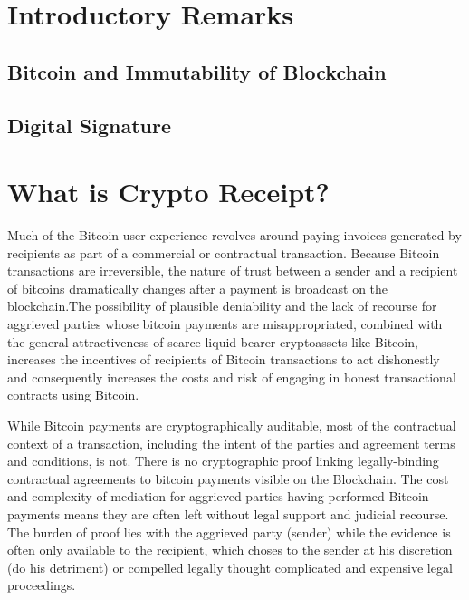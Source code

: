 


\section{Introductory Remarks}

\subsection{Bitcoin and Immutability of Blockchain}

\subsection{Digital Signature}
  


\section{What is Crypto Receipt?}

Much of the Bitcoin user experience revolves around paying invoices generated by recipients as part of a commercial or contractual transaction. Because Bitcoin transactions are irreversible, the nature of trust between a sender and a recipient of bitcoins dramatically changes after a payment is broadcast on the blockchain.The possibility of plausible deniability and the lack of recourse for aggrieved parties whose bitcoin payments are misappropriated, combined with the general attractiveness of scarce liquid bearer cryptoassets like Bitcoin, increases the incentives of recipients of Bitcoin transactions to act dishonestly and consequently increases the costs and risk of engaging in honest transactional contracts using Bitcoin. 

While Bitcoin payments are cryptographically auditable, most of the contractual context of a transaction, including the intent of the parties and agreement terms and conditions, is not. There is no cryptographic proof linking legally-binding contractual agreements to bitcoin payments visible on the Blockchain. The cost and complexity of mediation for aggrieved parties having performed Bitcoin payments means they are often left without legal support and judicial recourse. The burden of proof lies with the aggrieved party (sender) while the evidence is often only available to the recipient, which choses to the sender at his discretion (do his detriment) or compelled legally thought complicated and expensive legal proceedings.

